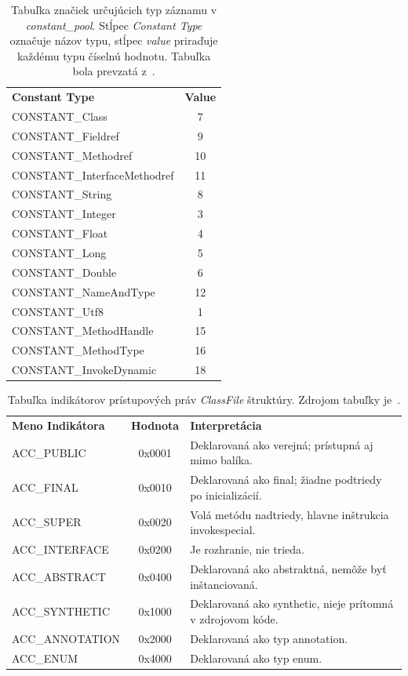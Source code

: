 \documentclass[11pt,final,oneside]{fithesis}
\begin{document}
\begin{table}
  \begin{tabular}{| l | c |}
    \hline
    \textbf{Constant Type} & \textbf{Value} \\
    \hhline{|=|=|}
    CONSTANT\_Class & 7 \\ \hline
    CONSTANT\_Fieldref & 9 \\ \hline
    CONSTANT\_Methodref & 10 \\ \hline
    CONSTANT\_InterfaceMethodref & 11 \\ \hline
    CONSTANT\_String & 8 \\ \hline
    CONSTANT\_Integer & 3 \\ \hline
    CONSTANT\_Float & 4 \\ \hline
    CONSTANT\_Long & 5 \\ \hline
    CONSTANT\_Double & 6 \\ \hline
    CONSTANT\_NameAndType & 12 \\ \hline
    CONSTANT\_Utf8 & 1 \\ \hline
    CONSTANT\_MethodHandle & 15 \\ \hline
    CONSTANT\_MethodType & 16 \\ \hline
    CONSTANT\_InvokeDynamic & 18 \\
    \hline
  \end{tabular}
  \caption{Tabuľka značiek určujúcich typ záznamu v \textit{constant\_pool}.
  Stĺpec \textit{Constant Type} označuje názov typu, stĺpec \textit{value}
  priraďuje každému typu číselnú hodnotu. Tabuľka bola prevzatá
  z~\cite{Lindholm:2013:JVM:2462629}.}
  \label{tab:tab1}
\end{table}

\begin{table}
  \begin{tabular}{| l | c | p{6cm} |}
    \hline
    \textbf{Meno Indikátora} & \textbf{Hodnota} & \textbf{Interpretácia} \\
    \hhline{|=|=|=|}
    ACC\_PUBLIC & 0x0001 & Deklarovaná ako verejná; prístupná aj mimo balíka.
    \\ \hline
    ACC\_FINAL & 0x0010 & Deklarovaná ako final; žiadne podtriedy po 
    inicializácií. \\ \hline
    ACC\_SUPER & 0x0020 & Volá metódu nadtriedy, hlavne inštrukcia 
    invokespecial. \\ \hline
    ACC\_INTERFACE & 0x0200 & Je rozhranie, nie trieda.\\ \hline
    ACC\_ABSTRACT & 0x0400 & Deklarovaná ako abstraktná, nemôže byť 
    inštanciovaná. \\ \hline
    ACC\_SYNTHETIC & 0x1000 & Deklarovaná ako synthetic, nieje prítomná v 
    zdrojovom kóde. \\ \hline
    ACC\_ANNOTATION & 0x2000 & Deklarovaná ako typ annotation. \\ \hline
    ACC\_ENUM & 0x4000 & Deklarovaná ako typ enum. \\    
    \hline
  \end{tabular}
  \caption{Tabuľka indikátorov prístupových práv \textit{ClassFile} štruktúry. 
  Zdrojom tabuľky je~\cite{Lindholm:2013:JVM:2462629}.}
  \label{tab:tab2}
\end{table}
\end{document}
